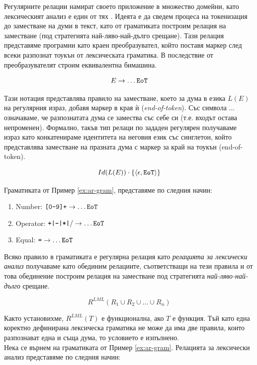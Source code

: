 \documentclass[12pt, oneside]{article}
\theoremstyle{definition}
\begin{document}
Регулярните релации намират своето приложение в множество домейни, като лексическият анализ е един от тях \cite{Karttunen:96}. Идеята е да сведем процеса на токенизация до заместване на думи в текст, като от граматиката построим релация на заместване (под стратегията най-ляво-най-дълго срещане). Тази релация представяме програмни като краен преобразувател, който поставя маркер след всеки разпознат тоукън от лексическата граматика. В последствие от преобразувателят строим еквивалентна бимашина.

\[ E \to \dots \verb/EoT/ \]

Тази нотация представлява правило на заместване, което за дума в езика \( L(E) \) на регулярния израз, добавя маркер в края ѝ (\emph{end-of-token}). Със символа \(\dots\) означаваме, че разпознатата дума се замества със себе си (т.е. входът остава непроменен). Формално, такъв тип релаци по зададен регулярен получаваме израз като конкатенираме идентитета на неговия език със синглетон, който представлява заместване на празната дума с маркер за край на тоукън (end-of-token).

\[ Id(L(E)) \cdot \{ \langle \epsilon, \verb/EoT/ \rangle \} \]

Граматиката от Пример \ref{ex:ar-gram}, представяме по следния начин:

\begin{enumerate}
	\item Number: \( \verb/[0-9]+/ \to \dots \verb/EoT/ \)
	\item Operator: \( \verb/+|-|*|// \to \dots \verb/EoT/ \)
	\item Equal: \( \verb/=/ \to \dots \verb/EoT/ \)
\end{enumerate}

Всяко правило в граматиката е регулярна релация като \emph{релацията за лексически анализ} получаваме като обединим релациите, съответстващи на тези правила и от това обединение построим релация на заместване под стратегията \emph{най-ляво-най-дълго} срещане.

\[ R^{LML}(R_{1} \cup R_{2} \cup \ldots \cup R_{n}) \]

Както установихме, \( R^{LML}(T) \) е функционална, ако \( T \) е функция. Тъй като една коректно дефинирана лексическа граматика не може да има две правила, които разпознават една и съща дума, то условието е изпълнено. \\
Нека се върнем на граматиката от Пример \ref{ex:ar-gram}. Релацията за лексически анализ представяме по следния начин:
\end{document}
